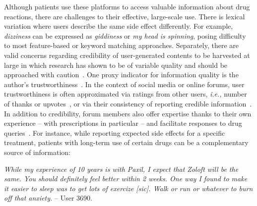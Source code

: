 \documentclass{bmcart}
\begin{document}
Although patients use these platforms to access valuable information about drug reactions, there are challenges to their effective, large-scale use. There is lexical variation where users describe the same side effect differently.  For example, \textit{dizziness} can be expressed as
\textit{giddiness} or \textit{my head is spinning}, posing difficulty to most feature-based or keyword matching approaches. Separately,  there are valid concerns regarding credibility of user-generated contents to be harvested at large in which research has shown to be of variable quality and should be approached with caution~\cite{impicciatore1997reliability,peterson2003consumers,hajli2015credibility,poddar2019}. One proxy indicator for information quality is the author's trustworthiness~\cite{li2016survey}. In the context of social media or online forums, user trustworthiness is 
often approximated via ratings from other users, \textit{i.e.,} number of thanks or upvotes~\cite{rains2009health}, or via their consistency of reporting credible information~\cite{hoang2018authenticity,mukherjee2014people}. In addition to credibility, forum members also offer expertise thanks to their own experience -- with prescriptions in particular -- and facilitate responses to drug queries~\cite{vydiswaran2019identifying}. For instance, while reporting expected side effects for a specific treatment, patients with long-term use of certain drugs can be a complementary source of information:  %

{\footnotesize
{\it While my experience of 10 years is with Paxil, I expect that Zoloft will be the same. You should definitely feel better within 2 weeks. One way I found to make it easier to sleep was to get lots of exercize [sic]. Walk or run or whatever to burn off that anxiety.} -- User 3690.
}
\end{document}
